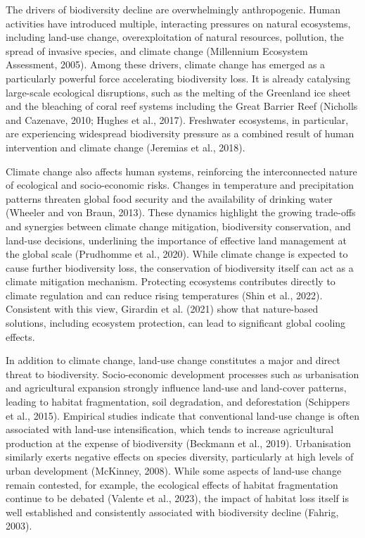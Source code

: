 \documentclass[12pt]{article}
\theoremstyle{break} %
\begin{document}
The drivers of biodiversity decline are overwhelmingly anthropogenic. Human activities have introduced multiple, interacting pressures on natural ecosystems, including land-use change, overexploitation of natural resources, pollution, the spread of invasive species, and climate change (Millennium Ecosystem Assessment, 2005). Among these drivers, climate change has emerged as a particularly powerful force accelerating biodiversity loss. It is already catalysing large-scale ecological disruptions, such as the melting of the Greenland ice sheet and the bleaching of coral reef systems including the Great Barrier Reef (Nicholls and Cazenave, 2010; Hughes et al., 2017). Freshwater ecosystems, in particular, are experiencing widespread biodiversity pressure as a combined result of human intervention and climate change (Jeremias et al., 2018).

Climate change also affects human systems, reinforcing the interconnected nature of ecological and socio-economic risks. Changes in temperature and precipitation patterns threaten global food security and the availability of drinking water (Wheeler and von Braun, 2013). These dynamics highlight the growing trade-offs and synergies between climate change mitigation, biodiversity conservation, and land-use decisions, underlining the importance of effective land management at the global scale (Prudhomme et al., 2020). While climate change is expected to cause further biodiversity loss, the conservation of biodiversity itself can act as a climate mitigation mechanism. Protecting ecosystems contributes directly to climate regulation and can reduce rising temperatures (Shin et al., 2022). Consistent with this view, Girardin et al. (2021) show that nature-based solutions, including ecosystem protection, can lead to significant global cooling effects.

In addition to climate change, land-use change constitutes a major and direct threat to biodiversity. Socio-economic development processes such as urbanisation and agricultural expansion strongly influence land-use and land-cover patterns, leading to habitat fragmentation, soil degradation, and deforestation (Schippers et al., 2015). Empirical studies indicate that conventional land-use change is often associated with land-use intensification, which tends to increase agricultural production at the expense of biodiversity (Beckmann et al., 2019). Urbanisation similarly exerts negative effects on species diversity, particularly at high levels of urban development (McKinney, 2008). While some aspects of land-use change remain contested, for example, the ecological effects of habitat fragmentation continue to be debated (Valente et al., 2023), the impact of habitat loss itself is well established and consistently associated with biodiversity decline (Fahrig, 2003).
\end{document}
